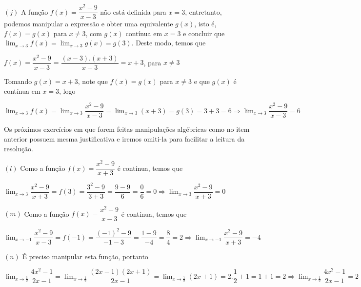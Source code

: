 \documentclass[12pt,openright,twoside,a4paper]{article}
\theoremstyle{definition}
\begin{document}
		$(j)$ A função $f(x) = \dfrac{x^{2} - 9}{x - 3}$ não está definida para $x = 3$, entretanto, podemos manipular a expressão e obter uma equivalente $g(x)$, isto é, $f(x) = g(x)$ para $x \neq 3$, com $g(x)$ contínua em $x = 3$ e concluir que $\displaystyle{\lim_{x \to 3} f(x)}=\displaystyle{\lim_{x \to 3} g(x)}=g(3)$. Deste modo, temos que \begin{center}$f(x) = \dfrac{x^{2} - 9}{x - 3} = \dfrac{(x - 3).(x + 3)}{x - 3} = x + 3$, para $x \neq 3$\end{center} Tomando $g(x) = x + 3$, note que $f(x)=g(x)$ para $x \neq 3$ e que $g(x)$ é contínua em $x = 3$, logo \begin{center}$\displaystyle{\lim_{x \to 3} f(x)} = \displaystyle{\lim_{x \to 3} \dfrac{x^{2} - 9}{x - 3}}=\displaystyle{\lim_{x \to 3} (x + 3)} = g(3) = 3 + 3 = 6 \Longrightarrow \displaystyle{\lim_{x \to 3} \dfrac{x^{2} - 9}{x - 3}} = 6$\end{center}
		
		Os próximos exercícios em que forem feitas manipulações algébricas como no item anterior possuem mesma justificativa e iremos omiti-la para facilitar a leitura da resolução.
		
		$(l)$ Como a função $f(x) = \dfrac{x^{2} - 9}{x + 3}$ é contínua, temos que \begin{center}$\displaystyle{\lim_{x \to 3} \dfrac{x^{2} - 9}{x + 3}} = f(3) = \dfrac{3^{2} - 9}{3 + 3} = \dfrac{9 - 9}{6} = \dfrac{0}{6} = 0 \Longrightarrow \displaystyle{\lim_{x \to 3} \dfrac{x^{2} - 9}{x + 3}} = 0$\end{center}
		
		$(m)$ Como a função $f(x) = \dfrac{x^{2}-9}{x - 3}$ é contínua, temos que \begin{center}$\displaystyle{\lim_{x \to -1} \dfrac{x^{2} - 9}{x - 3}} = f(-1) = \dfrac{(-1)^{2} - 9}{-1 - 3} = \dfrac{1-9}{-4} = \dfrac{8}{4} = 2 \Longrightarrow \displaystyle{\lim_{x \to -1} \dfrac{x^{2} - 9}{x + 3}} = -4$\end{center}
		
		$(n)$ É preciso manipular esta função, portanto \begin{center}$\displaystyle{\lim_{x \to \frac{1}{2}} \dfrac{4x^{2} - 1}{2x - 1}} = \displaystyle{\lim_{x \to \frac{1}{2}} \dfrac{(2x - 1)(2x + 1)}{2x - 1}} = \displaystyle{\lim_{x \to \frac{1}{2}} (2x + 1)} = 2.\dfrac{1}{2} + 1 = 1 + 1 = 2 \Longrightarrow \displaystyle{\lim_{x \to \frac{1}{2}} \dfrac{4x^{2} - 1}{2x - 1}} = 2$\end{center}
		
\end{document}
